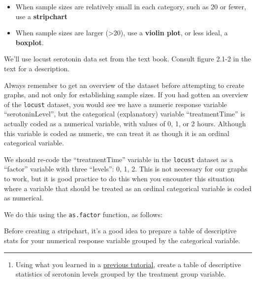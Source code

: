 \documentclass[
]{book}
\newenvironment{Shaded}{\begin{snugshade}}{\end{snugshade}}
\newcommand{\FunctionTok}[1]{\textcolor[rgb]{0.13,0.29,0.53}{\textbf{#1}}}
\newcommand{\NormalTok}[1]{#1}
\newcommand{\OtherTok}[1]{\textcolor[rgb]{0.56,0.35,0.01}{#1}}
\newcommand{\SpecialCharTok}[1]{\textcolor[rgb]{0.81,0.36,0.00}{\textbf{#1}}}
\providecommand{\tightlist}{%
  \setlength{\itemsep}{0pt}\setlength{\parskip}{0pt}}
\begin{document}
\begin{itemize}
\tightlist
\item
  When sample sizes are relatively small in each category, such as 20 or fewer, use a \textbf{stripchart}
\item
  When sample sizes are larger (\textgreater20), use a \textbf{violin plot}, or less ideal, a \textbf{boxplot}.
\end{itemize}

We'll use locust serotonin data set from the text book. Consult figure 2.1-2 in the text for a description.

Always remember to get an overview of the dataset before attempting to create graphs, and not only for establishing sample sizes. If you had gotten an overview of the \texttt{locust} dataset, you would see we have a numeric response variable ``serotoninLevel'', but the categorical (explanatory) variable ``treatmentTime'' is actually coded as a numerical variable, with values of 0, 1, or 2 hours. Although this variable is coded as numeric, we can treat it as though it is an ordinal categorical variable.

We should re-code the ``treatmentTime'' variable in the \texttt{locust} dataset as a ``factor'' variable with three ``levels'': 0, 1, 2. This is not necessary for our graphs to work, but it is good practice to do this when you encounter this situation where a variable that should be treated as an ordinal categorical variable is coded as numerical.

We do this using the \texttt{as.factor} function, as follows:

\begin{Shaded}
\end{Shaded}

Before creating a stripchart, it's a good idea to prepare a table of descriptive stats for your numerical response variable grouped by the categorical variable.

\begin{center}\rule{0.5\linewidth}{0.5pt}\end{center}

\begin{enumerate}
\def\labelenumi{\arabic{enumi}.}
\tightlist
\item
  Using what you learned in a \hyperref[desc_numeric_var_cat]{previous tutorial}, create a table of descriptive statistics of serotonin levels grouped by the treatment group variable.
\end{enumerate}
\end{document}
